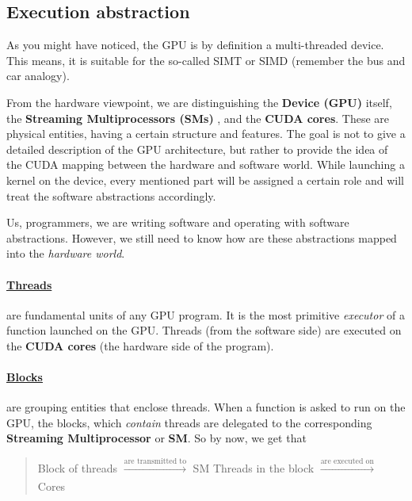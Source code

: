 \subsection{Execution abstraction}
As you might have noticed, the GPU is by definition a multi-threaded device. This means, it is suitable for the so-called 
SIMT or SIMD (remember the bus and car analogy).


From the hardware viewpoint, we are distinguishing the \textbf{Device (GPU)} itself, the \textbf{Streaming Multiprocessors (SMs)}
, and the \textbf{CUDA cores}. These are physical entities, having a certain structure and features. 
The goal is not to give a detailed description of the GPU architecture, but rather to provide the 
idea of the CUDA mapping between the hardware and software world. While launching a kernel on the device, 
every mentioned part will be assigned a certain role and will treat the software abstractions accordingly.

Us, programmers, we are writing software and operating with software abstractions. However, we still need to know 
how are these abstractions mapped into the \textit{hardware world}.

\vspace{-15pt}
\paragraph{\underline{Threads}} are fundamental units of any GPU program. It is the most primitive \textit{executor} of a function 
launched on the GPU. Threads (from the software side) are executed on the \textbf{CUDA cores} (the hardware side of the program).

\vspace{-15pt}
\paragraph{\underline{Blocks}} \label{blocks} are grouping entities that enclose threads. When a function is asked to run on the GPU, the 
blocks, which \textit{contain} threads are delegated to the corresponding \textbf{Streaming Multiprocessor} or \textbf{SM}.
So by now, we get that 

\begin{quote}
   \centering
   Block of threads $\xrightarrow[]{\text{are transmitted to}}$ SM \newline
   Threads in the block $\xrightarrow[]{\text{are executed on}}$ Cores 
\end{quote} 

